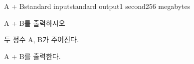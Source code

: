 \begin{problem}{A + B}{standard input}{standard output}{1 second}{256 megabytes}

A + B를 출력하시오

\InputFile
두 정수 A, B가 주어진다.

\OutputFile
A + B를 출력한다.


\end{problem}

